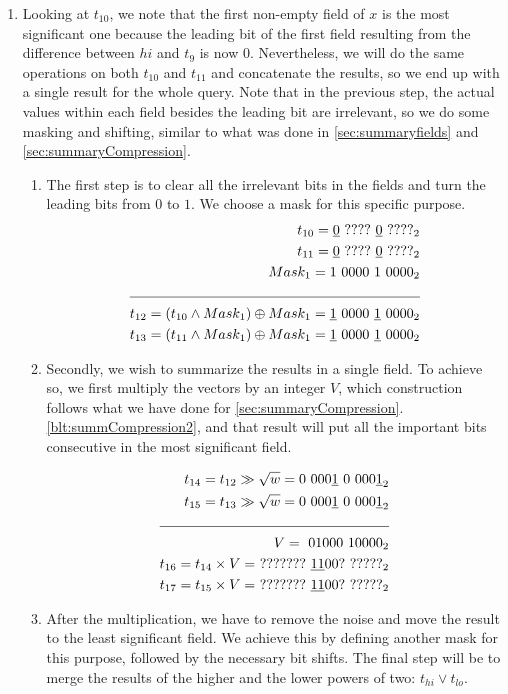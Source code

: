 \begin{enumerate}
    \item \label{blt:parallel4}
    Looking at $t_{10}$, we note that the first non-empty field of $x$ is the most significant one because the leading bit of the first field resulting from the difference between $hi$ and $t_9$ is now $0$. Nevertheless, we will do the same operations on both $t_{10}$ and $t_{11}$ and concatenate the results, so we end up with a single result for the whole query. Note that in the previous step, the actual values within each field besides the leading bit are irrelevant, so we do some masking and shifting, similar to what was done in \ref{sec:summaryfields} and \ref{sec:summaryCompression}.
    \begin{enumerate}
        \item
        The first step is to clear all the irrelevant bits in the fields and turn the leading bits from $0$ to $1$. We choose a mask for this specific purpose.
        \begin{align*}
            t_{10} = \underline{0}\ ????\ \underline{0}\ ????_2&\\
            t_{11} = \underline{0}\ ????\ \underline{0}\ ????_2&\\
            Mask_1 = 1\ 0000\ 1\ 0000_2&\\ \cline{1-2}
            t_{12} = (t_{10} \wedge Mask_1) \oplus Mask_1 = \underline{1}\ 0000\ \underline{1}\ 0000_2&\\
            t_{13} = (t_{11} \wedge Mask_1) \oplus Mask_1 = \underline{1}\ 0000\ \underline{1}\ 0000_2&
        \end{align*}
        \item
        Secondly, we wish to summarize the results in a single field. To achieve so, we first multiply the vectors by an integer $V$, which construction follows what we have done for \ref{sec:summaryCompression}.\ref{blt:summCompression2}, and that result will put all the important bits consecutive in the most significant field.
        
        \begin{align*}
            t_{14} = t_{12} \gg \sqrt{w} = 0\ 000\underline{1}\ 0\ 000\underline{1}_2& \\
            t_{15} = t_{13} \gg \sqrt{w} = 0\ 000\underline{1}\ 0\ 000\underline{1}_2& \\
            \cline{1-2}
            V =\ 01000\ 10000_2 & \\
            t_{16} = t_{14} \times V =\ ???????\ \underline{11}00?\ ?????_2& \\
            t_{17} = t_{15} \times V =\ ???????\ \underline{11}00?\ ?????_2& \\
        \end{align*}
        \item
        After the multiplication, we have to remove the noise and move the result to the least significant field. We achieve this by defining another mask for this purpose, followed by the necessary bit shifts. The final step will be to merge the results of the higher and the lower powers of two: $t_{hi} \vee t_{lo}$.
        

\end{enumerate}
\end{enumerate}
